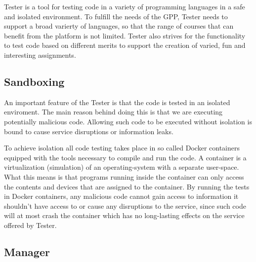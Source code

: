 Tester is a tool for testing code in a variety of programming languages in a safe and isolated environment. To fulfill the needs of the GPP, Tester needs to support a  broad varierty of languages, so that the range of courses that can benefit from the platform is not limited. Tester also strives for the functionality to test code based on different merits to support the creation of varied, fun and interesting assignments.

\subsection{Sandboxing}
An important feature of the Tester is that the code is tested in an isolated enviroment. The main reason behind doing this is that we are executing potentially malicious code. Allowing such code to be executed without isolation is bound to cause service disruptions or information leaks.

To achieve isolation all code testing takes place in so called Docker containers equipped with the tools necessary to compile and run the code. A container is a virtualization (simulation) of an operating-system with a separate user-space. What this means is that programs running inside the container can only access the contents and devices that are assigned to the container. By running the tests in Docker containers, any malicious code cannot gain access to information it shouldn't have access to or cause any disruptions to the service, since such code will at most crash the container which has no long-lasting effects on the service offered by Tester.
\subsection{Manager}

